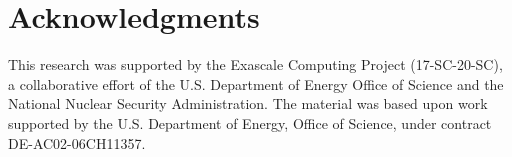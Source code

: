\documentclass{anstrans}
\begin{document}
\section{Acknowledgments}

This research was supported by the Exascale Computing Project (17-SC-20-SC), a
collaborative effort of the U.S. Department of Energy Office of Science and the
National Nuclear Security Administration. The material was based upon work
supported by the U.S. Department of Energy, Office of Science, under contract
DE-AC02-06CH11357.



\end{document}
